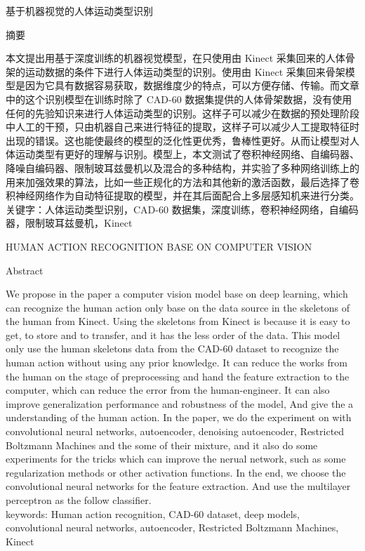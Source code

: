 基于机器视觉的人体运动类型识别

摘要

本文提出用基于深度训练的机器视觉模型，在只使用由 Kinect
采集回来的人体骨架的运动数据的条件下进行人体运动类型的识别。使用由
Kinect
采集回来骨架模型是因为它具有数据容易获取，数据维度少的特点，可以方便存储、传输。而文章中的这个识别模型在训练时除了
CAD-60
数据集提供的人体骨架数据，没有使用任何的先验知识来进行人体运动类型的识别。这样子可以减少在数据的预处理阶段中人工的干预，只由机器自己来进行特征的提取，这样子可以减少人工提取特征时出现的错误。这也能使最终的模型的泛化性更优秀，鲁棒性更好。从而让模型对人体运动类型有更好的理解与识别。模型上，本文测试了卷积神经网络、自编码器、降噪自编码器、限制玻耳兹曼机以及混合的多种结构，并实验了多种网络训练上的用来加强效果的算法，比如一些正规化的方法和其他新的激活函数，最后选择了卷积神经网络作为自动特征提取的模型，并在其后面配合上多层感知机来进行分类。\\关键字：人体运动类型识别，CAD-60
数据集，深度训练，卷积神经网络，自编码器，限制玻耳兹曼机，Kinect

HUMAN ACTION RECOGNITION BASE ON COMPUTER VISION

Abstract

We propose in the paper a computer vision model base on deep learning,
which can recognize the human action only base on the data source in the
skeletons of the human from Kinect. Using the skeletons from Kinect is
because it is easy to get, to store and to transfer, and it has the less
order of the data. This model only use the human skeletons data from the
CAD-60 dataset to recognize the human action without using any prior
knowledge. It can reduce the works from the human on the stage of
preprocessing and hand the feature extraction to the computer, which can
reduce the error from the human-engineer. It can also improve
generalization performance and robustness of the model, And give the a
understanding of the human action. In the paper, we do the experiment on
with convolutional neural networks, autoencoder, denoising autoencoder,
Restricted Boltzmann Machines and the some of their mixture, and it also
do some experiments for the tricks which can improve the nerual network,
such as some regularization methods or other activation functions. In
the end, we choose the convolutional neural networks for the feature
extraction. And use the multilayer perceptron as the follow
classifier.\\keywords: Human action recognition, CAD-60 dataset, deep
models, convolutional neural networks, autoencoder, Restricted Boltzmann
Machines, Kinect

